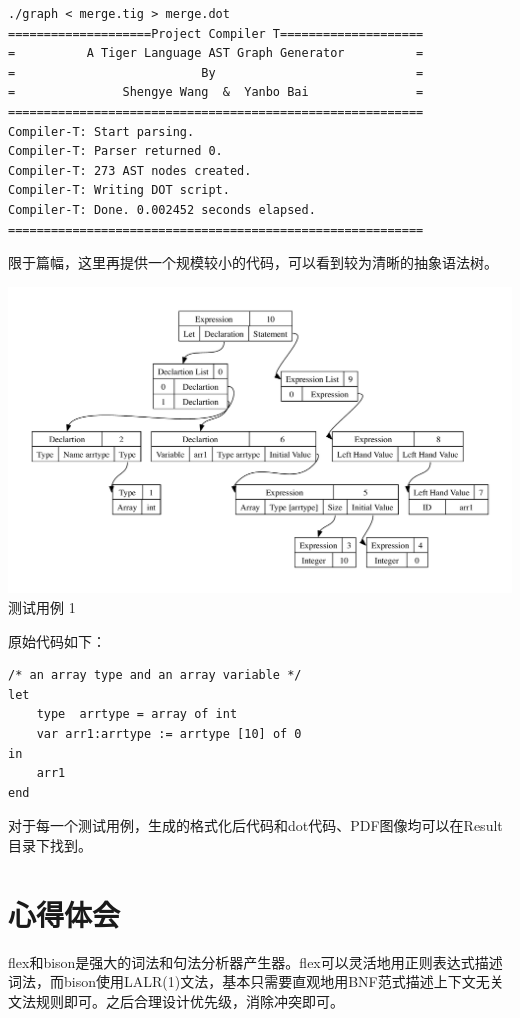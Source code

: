 \begin{verbatim}
./graph < merge.tig > merge.dot
====================Project Compiler T====================
=          A Tiger Language AST Graph Generator          =
=                          By                            =
=               Shengye Wang  &  Yanbo Bai               =
==========================================================
Compiler-T: Start parsing.
Compiler-T: Parser returned 0.
Compiler-T: 273 AST nodes created.
Compiler-T: Writing DOT script.
Compiler-T: Done. 0.002452 seconds elapsed.
==========================================================
\end{verbatim}

限于篇幅，这里再提供一个规模较小的代码，可以看到较为清晰的抽象语法树。

\begin{center}
\includegraphics[width=\columnwidth]{small}  \\
测试用例 1
\end{center}

原始代码如下：

\begin{verbatim}
/* an array type and an array variable */
let
	type  arrtype = array of int
	var arr1:arrtype := arrtype [10] of 0
in
	arr1
end
\end{verbatim}

对于每一个测试用例，生成的格式化后代码和dot代码、PDF图像均可以在Result目录下找到。

\section{心得体会}

flex和bison是强大的词法和句法分析器产生器。flex可以灵活地用正则表达式描述词法，而bison使用LALR(1)文法，基本只需要直观地用BNF范式描述上下文无关文法规则即可。之后合理设计优先级，消除冲突即可。

